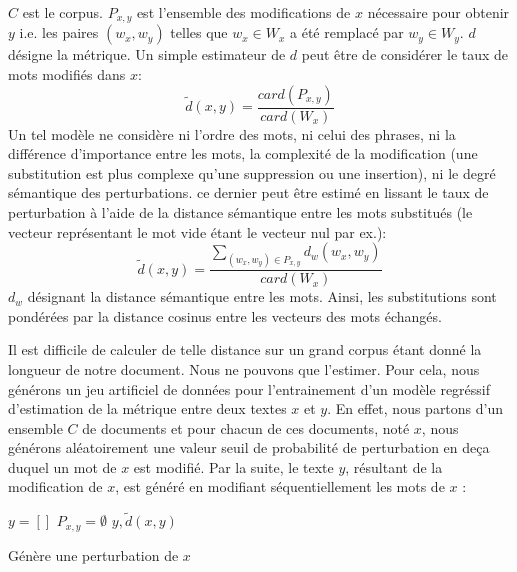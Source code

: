 $C$ est le corpus. $P_{x,y}$ est l'ensemble des modifications de $x$ nécessaire pour obtenir $y$ i.e. les paires $(w_x, w_y)$ telles que $w_x \in W_x$ a été remplacé par $w_y \in W_y$. $d$ désigne la métrique. Un simple estimateur de $d$ peut être de considérer le taux de mots modifiés dans $x$: 
\begin{equation}
\widetilde{d}(x,y) = \frac{card(P_{x,y})}{card(W_x)}
\end{equation}
 Un tel modèle ne considère ni l'ordre des mots, ni celui des phrases, ni la différence d'importance entre les mots, la complexité de la modification (une substitution est plus complexe qu'une suppression ou une insertion), ni le degré sémantique des perturbations. ce dernier peut être estimé en lissant le taux de perturbation à l'aide de la distance sémantique entre les mots substitués (le vecteur représentant le mot vide étant le vecteur nul par ex.):
\begin{equation}
\widetilde{d}(x,y) = \frac{\sum\limits_{(w_x, w_y) \in P_{x,y}} d_w(w_x,w_y)}{card(W_x)} \label{equation:similarite:somme-dist-mots}
\end{equation}
$d_w$ désignant la distance sémantique entre les mots. Ainsi, les substitutions sont pondérées par la distance cosinus entre les vecteurs des mots échangés.

Il est difficile de calculer de telle distance sur un grand corpus étant donné la longueur de notre document. 
Nous ne pouvons que l'estimer. Pour cela, nous générons un jeu artificiel de données pour l'entrainement d'un modèle regréssif d'estimation de la métrique entre deux textes $x$ et $y$. En effet, nous partons d'un ensemble $C$ de documents et pour chacun de ces documents, noté $x$, nous générons aléatoirement une valeur seuil de probabilité de perturbation en deça duquel un mot de $x$ est modifié. Par la suite, le texte  $y$, résultant de la modification de $x$, est généré en modifiant séquentiellement les mots de $x$ :

\begin{algorithm}[H]
 $y = [] $\; 
 $P_{x,y} = \emptyset$\;
 \Return $y, \widetilde{d}(x,y)$\;
 \caption{Génère une perturbation de $x$} \label{algo:similarite:perturbation}
\end{algorithm}


